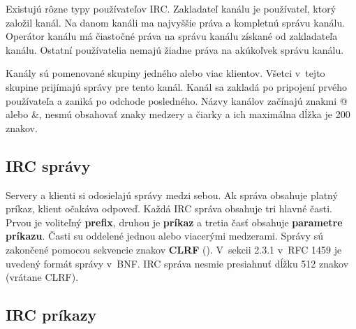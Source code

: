\newpage

Existujú rôzne typy používateľov IRC. Zakladateľ kanálu je používateľ, ktorý založil kanál. Na danom kanáli ma najvyššie práva a kompletnú správu kanálu. Operátor kanálu má čiastočné práva na správu kanálu získané od zakladateľa kanálu. Ostatní používatelia nemajú žiadne práva na akúkoľvek správu kanálu.

Kanály sú pomenované skupiny jedného alebo viac klientov. Všetci v~tejto skupine prijímajú správy pre tento kanál. Kanál sa zakladá po pripojení prvého používateľa a zaniká po odchode posledného. Názvy kanálov začínajú znakmi @ alebo \&, nesmú obsahovať znaky medzery a čiarky a ich maximálna dĺžka je 200 znakov.

\subsection{IRC správy}
Servery a klienti si odosielajú správy medzi sebou. Ak správa obsahuje platný príkaz, klient očakáva odpoveď. Každá IRC správa obsahuje tri hlavné časti. Prvou je voliteľný \textbf{prefix}, druhou je \textbf{príkaz} a tretia časť obsahuje \textbf{parametre príkazu}. Časti su oddelené jednou alebo viacerými medzerami. Správy sú zakončené pomocou sekvencie znakov \textbf{CLRF} (). V~sekcii 2.3.1 v~RFC 1459 \cite{rfc1459} je uvedený formát správy v~BNF. IRC správa nesmie presiahnuť dĺžku 512 znakov (vrátane CLRF).

\newpage

\subsection{IRC príkazy}

